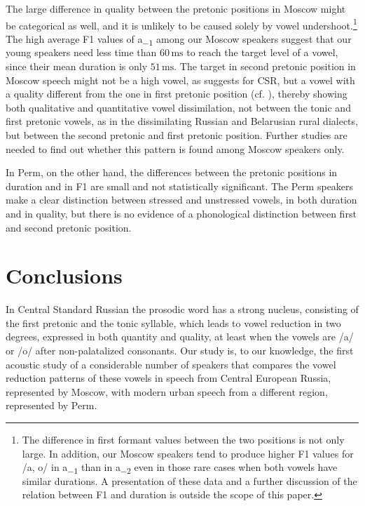 \documentclass[output=paper,colorlinks,citecolor=black]{langscibook}
\begin{document}
The large difference in quality between the pretonic positions in Moscow might be categorical as well, and it is unlikely to be caused solely by vowel undershoot.\footnote{The difference in first formant values between the two positions is not only large. In addition, our Moscow speakers tend to produce higher F1 values for /a, o/ in a\textsubscript{\tiny{$-1$}} than in a\textsubscript{\tiny{$-2$}} even in those rare cases when both vowels have similar durations. A presentation of these data and a further discussion of the relation between F1 and duration is outside the scope of this paper.} The high average F1 values of a\textsubscript{\tiny{$-1$}} among our Moscow speakers suggest that our young speakers need less time than $60\,\text{ms}$ to reach the target level of a vowel, since their mean duration is only $51\,\text{ms}$. The target in second pretonic position in Moscow speech might not be a high vowel, as \citet{Barnes2006} suggests for CSR, but a vowel with a quality different from the one in first pretonic position (cf. \citealt{Trubetzkoy1969}), thereby showing both qualitative and quantitative vowel dissimilation, not between the tonic and first pretonic vowels, as in the dissimilating Russian and Belarusian rural dialects, but between the second pretonic and first pretonic position. Further studies are needed to find out whether this pattern is found among Moscow speakers only.

In Perm, on the other hand, the differences between the pretonic positions in duration and in F1 are small and not statistically significant. The Perm speakers make a clear distinction between stressed and unstressed vowels, in both duration and in quality, but there is no evidence of a phonological distinction between first and second pretonic position.

\section{Conclusions}

In Central Standard Russian the prosodic word has a strong nucleus, consisting of the first pretonic and the tonic syllable, which leads to vowel reduction in two degrees, expressed in both quantity and quality, at least when the vowels are /a/ or /o/ after non-palatalized consonants. Our study is, to our knowledge, the first acoustic study of a considerable number of speakers that compares the vowel reduction patterns of these vowels in speech from Central European Russia, represented by Moscow, with modern urban speech from a different region, represented by Perm.
\end{document}
